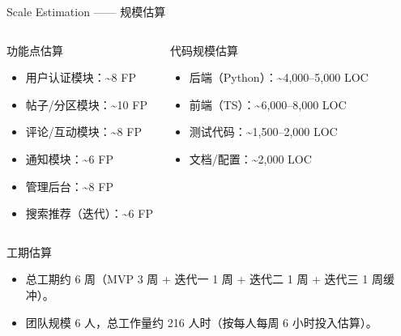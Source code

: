 \documentclass[aspectratio=169,UTF8]{ctexbeamer}
\begin{document}
\begin{frame}{Scale Estimation —— 规模估算}
    \begin{columns}
        \begin{block}{功能点估算}
            \begin{itemize}
                \item 用户认证模块：\textasciitilde 8 FP
                \item 帖子/分区模块：\textasciitilde 10 FP
                \item 评论/互动模块：\textasciitilde 8 FP
                \item 通知模块：\textasciitilde 6 FP
                \item 管理后台：\textasciitilde 8 FP
                \item 搜索推荐（迭代）：\textasciitilde 6 FP
            \end{itemize}
        \end{block}
        \begin{block}{代码规模估算}
            \begin{itemize}
                \item 后端（Python）：\textasciitilde 4,000--5,000 LOC
                \item 前端（TS）：\textasciitilde 6,000--8,000 LOC
                \item 测试代码：\textasciitilde 1,500--2,000 LOC
                \item 文档/配置：\textasciitilde 2,000 LOC
            \end{itemize}
        \end{block}
    \end{columns}
    \vspace{0.3cm}
    \begin{block}{工期估算}
        \begin{itemize}
            \item 总工期约 6 周（MVP 3 周 + 迭代一 1 周 + 迭代二 1 周 + 迭代三 1 周缓冲）。
            \item 团队规模 6 人，总工作量约 216 人时（按每人每周 6 小时投入估算）。
        \end{itemize}
    \end{block}
\end{frame}
\end{document}
